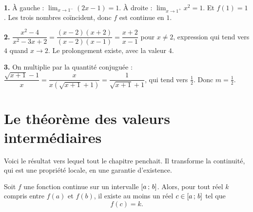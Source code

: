 \begin{corrige}
\textbf{1.} À gauche : $\lim_{x \to 1^{-}} (2x-1) = 1$. À droite :
$\lim_{x \to 1^{+}} x^{2} = 1$. Et $f(1) = 1$. Les trois nombres coïncident,
donc $f$ est continue en $1$.

\textbf{2.} $\dfrac{x^{2}-4}{x^{2}-3x+2} = \dfrac{(x-2)(x+2)}{(x-2)(x-1)} = \dfrac{x+2}{x-1}$
pour $x \neq 2$, expression qui tend vers $4$ quand $x \to 2$. Le prolongement
existe, avec la valeur $4$.

\textbf{3.} On multiplie par la quantité conjuguée :
$\dfrac{\sqrt{x+1}-1}{x} = \dfrac{x}{x\left(\sqrt{x+1}+1\right)} = \dfrac{1}{\sqrt{x+1}+1}$,
qui tend vers $\tfrac{1}{2}$. Donc $m = \tfrac{1}{2}$.
\end{corrige}

\section{Le théorème des valeurs intermédiaires}

Voici le résultat vers lequel tout le chapitre penchait. Il transforme la
continuité, qui est une propriété locale, en une garantie d'existence.

\begin{theoreme}
Soit $f$ une fonction continue sur un intervalle $\left[a\,;\,b\right]$. Alors,
pour tout réel $k$ compris entre $f(a)$ et $f(b)$, il existe au moins un réel
$c \in \left[a\,;\,b\right]$ tel que
\[
  f(c) = k .
\]
\end{theoreme}


